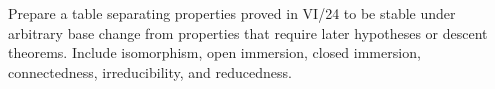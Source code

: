 \begin{problem}\label{chall:vi24-05}
Prepare a table separating properties proved in VI/24 to be stable under arbitrary base change from properties that require later hypotheses or descent theorems. Include isomorphism, open immersion, closed immersion, connectedness, irreducibility, and reducedness.
\end{problem}
